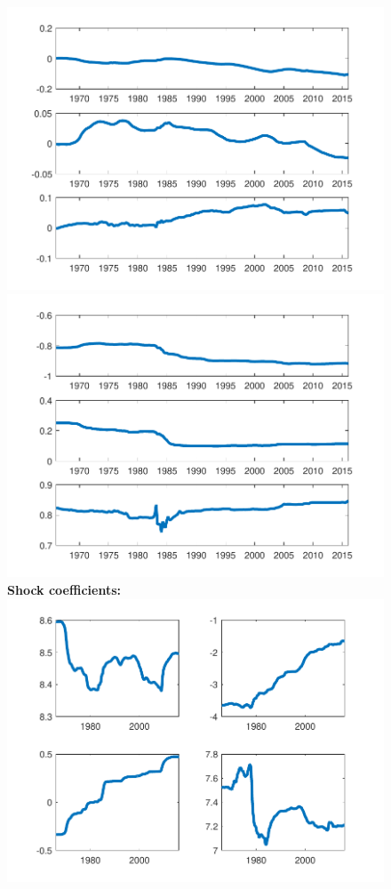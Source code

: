 \documentclass[12pt,reqno]{article}
\numberwithin{equation}{section}
\begin{document}
\begin{figure}[H]
\includegraphics[scale=0.6]{NKPC_optim_init_MSV_alphas.pdf}
\includegraphics[scale=0.6]{NKPC_optim_init_MSV_betas.pdf}\\

\textbf{Shock coefficients:}\\

\includegraphics[scale=0.6]{NKPC_optim_init_MSV_shockCoef.pdf}\\


\end{figure}
\end{document}
